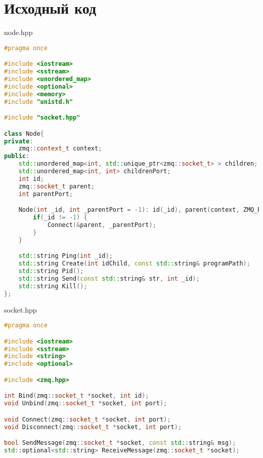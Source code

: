 \documentclass[a4paper, 12pt]{article}
\begin{document}
\newpage

\section{Исходный код}
node.hpp
\begin{lstlisting}[language=C++]
#pragma once

#include <iostream>
#include <sstream>
#include <unordered_map>
#include <optional>
#include <memory>
#include "unistd.h"

#include "socket.hpp"

class Node{
private:
    zmq::context_t context;
public:
    std::unordered_map<int, std::unique_ptr<zmq::socket_t> > children;
    std::unordered_map<int, int> childrenPort;
    int id;
    zmq::socket_t parent;
    int parentPort;

    Node(int _id, int _parentPort = -1): id(_id), parent(context, ZMQ_REP), parentPort(_parentPort) {
        if(_id != -1) {
            Connect(&parent, _parentPort);
        }
    }

    std::string Ping(int _id);
    std::string Create(int idChild, const std::string& programPath);
    std::string Pid();
    std::string Send(const std::string& str, int _id);
    std::string Kill();
};
\end{lstlisting}

socket.hpp
\begin{lstlisting}[language=C++]
#pragma once

#include <iostream>
#include <sstream>
#include <string>
#include <optional>

#include <zmq.hpp>

int Bind(zmq::socket_t *socket, int id);
void Unbind(zmq::socket_t *socket, int port);

void Connect(zmq::socket_t *socket, int port);
void Disconnect(zmq::socket_t *socket, int port);

bool SendMessage(zmq::socket_t *socket, const std::string& msg);
std::optional<std::string> ReceiveMessage(zmq::socket_t *socket);
\end{lstlisting}
\end{document}
